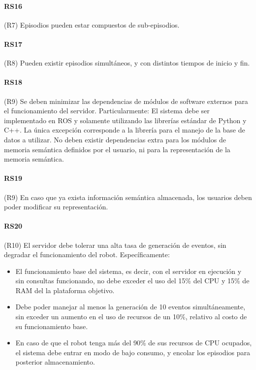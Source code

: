 \paragraph{RS16}
(R7) Episodios pueden estar compuestos de sub-episodios.

\paragraph{RS17}
(R8) Pueden existir episodios simultáneos, y con distintos tiempos de inicio y fin.

\paragraph{RS18}
(R9) Se deben minimizar las dependencias de módulos de software externos para el funcionamiento del servidor. Particularmente:
El sistema debe ser implementado en ROS y solamente utilizando las librerías estándar de Python y C++. La única excepción corresponde a la librería para el manejo de la base de datos a utilizar.
No deben existir dependencias extra para los módulos de memoria semántica definidos por el usuario, ni para la representación de la memoria semántica.

\paragraph{RS19}
(R9) En caso que ya exista información semántica almacenada, los usuarios deben poder modificar su representación.

\paragraph{RS20}
(R10) El servidor debe tolerar una alta tasa de generación de eventos, sin degradar el funcionamiento del robot. Específicamente:
\begin{itemize}
	\item El funcionamiento base del sistema, es decir, con el servidor en ejecución y sin consultas funcionando, no debe exceder el uso del 15\% del CPU y 15\% de RAM del la plataforma objetivo.
	\item Debe poder manejar al menos la generación de 10 eventos simultáneamente, sin exceder un aumento en el uso de recursos de un 10\%, relativo al costo de su funcionamiento base.
	\item En caso de que el robot tenga más del 90\% de sus recursos de CPU ocupados, el sistema debe entrar en modo de bajo consumo, y encolar los episodios para posterior almacenamiento.
\end{itemize}


